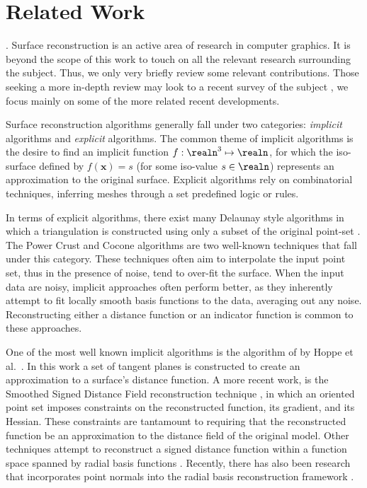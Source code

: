 \section{Related Work}
.
Surface reconstruction is an active area of research in computer graphics. It is beyond the scope of this work to touch on all the relevant research surrounding the subject. Thus, we only very briefly review some relevant contributions. Those seeking a more in-depth review may look to a recent survey of the subject \cite{sve05ss}, we focus mainly on some of the more related recent developments. 

Surface reconstruction algorithms generally fall under two categories:
\emph{implicit} algorithms and \emph{explicit} algorithms. The common
theme of implicit algorithms is the desire to find an implicit
function $f : \realn^3 \mapsto \realn $, for which the iso-surface
defined by $f(\mathbf{x})=s$ (for some iso-value $s \in \realn$)
represents an approximation to the original surface. Explicit
algorithms rely on combinatorial techniques, inferring meshes through
a set predefined logic or rules.

In terms of explicit algorithms, there exist many Delaunay style
algorithms in which a triangulation is constructed using only a subset
of the original point-set \cite{delaunay}. The Power Crust
\cite{powercrust} and Cocone \cite{cocone} algorithms are two
well-known techniques that fall under this category. These techniques
often aim to interpolate the input point set, thus in the presence of
noise, tend to over-fit the surface. When the input data are noisy,
implicit approaches often perform better, as they inherently attempt
to fit locally smooth basis functions to the data, averaging out any
noise. Reconstructing either a distance function or an indicator
function is common to these approaches.

One of the most well known implicit algorithms is the %
algorithm of by Hoppe et al.~\cite{hoppecut}. In this work a set of
tangent planes is constructed to create an approximation to a
surface's distance function. A more recent work, is the Smoothed
Signed Distance Field reconstruction technique \cite{ssdrecon}, in
which an oriented point set imposes constraints on the reconstructed
function, its gradient, and its Hessian. These constraints are
tantamount to requiring that the reconstructed function be an
approximation to the distance field of the original model. Other
techniques attempt to reconstruct a signed distance function within a
function space spanned by radial basis functions \cite{radial}.
Recently, there has also been research that incorporates point normals
into the radial basis reconstruction framework \cite{hermite}.

